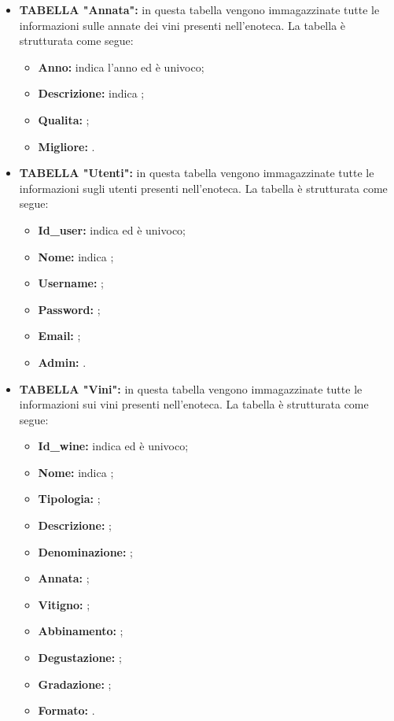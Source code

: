 \begin{itemize}
	\item \textbf{TABELLA "Annata":} in questa tabella vengono immagazzinate tutte le
	informazioni sulle annate dei vini presenti nell'enoteca. La tabella è strutturata come segue:
	\begin{itemize}
		\item \textbf{Anno:} indica l'anno ed è univoco;
		\item \textbf{Descrizione:} indica ;
		\item \textbf{Qualita:} ;
		\item \textbf{Migliore:} .
	\end{itemize}	
	\item \textbf{TABELLA "Utenti":} in questa tabella vengono immagazzinate tutte le
	informazioni sugli utenti presenti nell'enoteca. La tabella è strutturata
	come segue:
	\begin{itemize}
		\item \textbf{Id\_user:} indica ed è univoco;
		\item \textbf{Nome:} indica ;
		\item \textbf{Username:} ;
		\item \textbf{Password:} ;
		\item \textbf{Email:} ;
		\item \textbf{Admin:} .
	\end{itemize}
	\item \textbf{TABELLA "Vini":} in questa tabella vengono immagazzinate tutte le
	informazioni sui vini presenti nell'enoteca. La tabella è strutturata
	come segue:
	\begin{itemize}
		\item \textbf{Id\_wine:} indica ed è univoco;
		\item \textbf{Nome:} indica ;
		\item \textbf{Tipologia:} ;
		\item \textbf{Descrizione:} ;
		\item \textbf{Denominazione:} ;
		\item \textbf{Annata:} ;
		\item \textbf{Vitigno:} ;
		\item \textbf{Abbinamento:} ;
		\item \textbf{Degustazione:} ;
		\item \textbf{Gradazione:} ;
		\item \textbf{Formato:} .
	\end{itemize}
\end{itemize}

